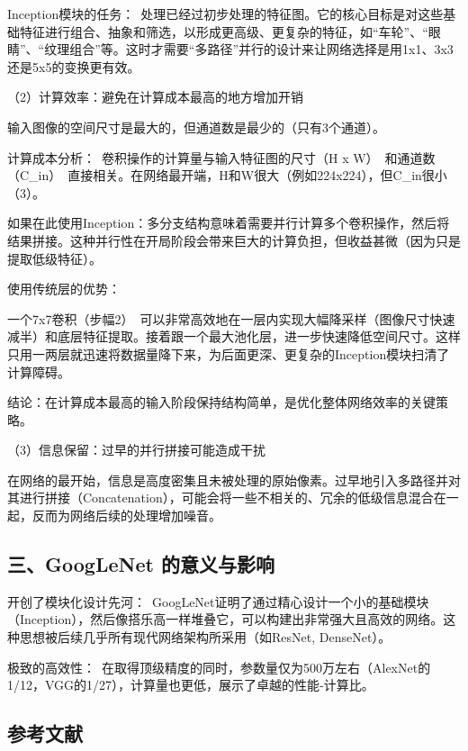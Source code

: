 Inception模块的任务：~处理已经过初步处理的特征图。它的核心目标是对这些基础特征进行组合、抽象和筛选，以形成更高级、更复杂的特征，如``车轮''、``眼睛''、``纹理组合''等。这时才需要``多路径''并行的设计来让网络选择是用1x1、3x3还是5x5的变换更有效。

（2）计算效率：避免在计算成本最高的地方增加开销

输入图像的空间尺寸是最大的，但通道数是最少的（只有3个通道）。

计算成本分析：~卷积操作的计算量与输入特征图的尺寸（H x W）~和通道数（C\_in）~直接相关。在网络最开端，H和W很大（例如224x224），但C\_in很小（3）。

如果在此使用Inception：多分支结构意味着需要并行计算多个卷积操作，然后将结果拼接。这种并行性在开局阶段会带来巨大的计算负担，但收益甚微（因为只是提取低级特征）。

使用传统层的优势：

一个7x7卷积（步幅2）~可以非常高效地在一层内实现大幅降采样（图像尺寸快速减半）和底层特征提取。接着跟一个最大池化层，进一步快速降低空间尺寸。这样只用一两层就迅速将数据量降下来，为后面更深、更复杂的Inception模块扫清了计算障碍。

结论：在计算成本最高的输入阶段保持结构简单，是优化整体网络效率的关键策略。

（3）信息保留：过早的并行拼接可能造成干扰

在网络的最开始，信息是高度密集且未被处理的原始像素。过早地引入多路径并对其进行拼接（Concatenation），可能会将一些不相关的、冗余的低级信息混合在一起，反而为网络后续的处理增加噪音。

\hypertarget{ux4e09googlenet-ux7684ux610fux4e49ux4e0eux5f71ux54cd}{%
\subsection{三、GoogLeNet 的意义与影响}\label{ux4e09googlenet-ux7684ux610fux4e49ux4e0eux5f71ux54cd}}

开创了模块化设计先河：~GoogLeNet证明了通过精心设计一个小的基础模块（Inception），然后像搭乐高一样堆叠它，可以构建出非常强大且高效的网络。这种思想被后续几乎所有现代网络架构所采用（如ResNet, DenseNet）。

极致的高效性：~在取得顶级精度的同时，参数量仅为500万左右（AlexNet的1/12，VGG的1/27），计算量也更低，展示了卓越的性能-计算比。

\hypertarget{ux53c2ux8003ux6587ux732e-11}{%
\subsection{参考文献}\label{ux53c2ux8003ux6587ux732e-11}}

